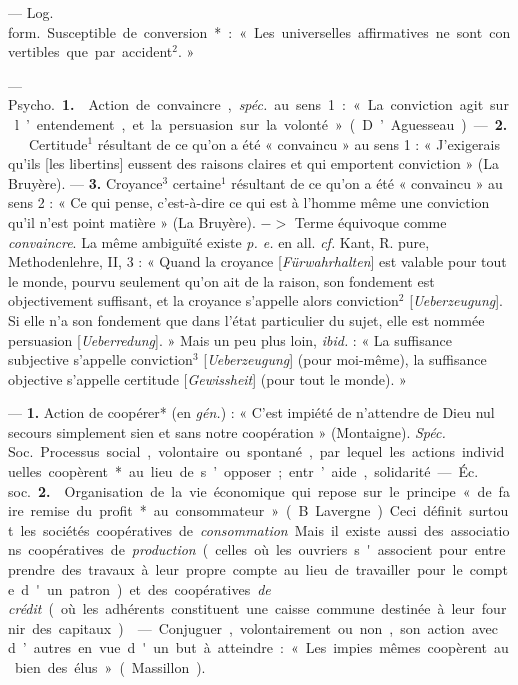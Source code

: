\begin{itemize}[leftmargin=1cm, label=, itemsep=11pt]
 — \si{Log. form.} Susceptible de conversion* : « Les universelles
affirmatives ne sont convertibles que par accident$^2$. »

 — \si{Psycho.} {\bf 1.}  Action de
convaincre,  {\it spéc.} au sens 1 : « La
conviction agit sur l’entendement,
et la persuasion sur la volonté »
(D’Aguesseau). — {\bf 2.}   Certitude$^1$
résultant de ce qu’on a été « convaincu » au sens 1 : « J’exigerais
qu'ils [les libertins] eussent des raisons claires et qui emportent conviction » (La Bruyère). — {\bf 3.}  
Croyance$^3$ certaine$^1$ résultant de ce
qu’on a été « convaincu » au sens 2 :
« Ce qui pense, c’est-à-dire ce qui
est à l’homme même une conviction
qu’il n’est point matière » (La
Bruyère). $->$ Terme équivoque
comme {\it convaincre}. La même ambiguïté existe {\it p. e.} en all. {\it cf.} Kant,
R. pure, Methodenlehre, II, 3 :
« Quand la croyance [{\it Fürwahrhalten}] est valable pour tout le monde,
pourvu seulement qu’on ait de la
raison, son fondement est objectivement suffisant, et la croyance
s’appelle alors conviction$^2$ [{\it Ueberzeugung}]. Si elle n’a son fondement
que dans l’état particulier du sujet,
elle est nommée persuasion [{\it Ueberredung}]. » Mais un peu plus loin, {\it ibid.} :
« La suffisance subjective s'appelle
conviction$^3$ [{\it Ueberzeugung}] (pour
moi-même), la suffisance objective
s’appelle certitude [{\it Gewissheit}] (pour
tout le monde). »

 — {\bf 1.}  Action de coopérer* (en  {\it gén.}) : « C’est impiété de
n'attendre de Dieu nul secours simplement sien et sans notre coopération » (Montaigne). {\it Spéc.} \si{Soc.} Processus social, volontaire ou spontané, par lequel les actions individuelles coopèrent* au lieu de s’opposer; entr’aide, solidarité.

— \si{Éc. soc.} {\bf 2.}  Organisation de
la vie économique qui repose sur le
principe « de faire remise du profit
*au consommateur » (B. Lavergne).
Ceci définit surtout les sociétés
coopératives de {\it consommation}. Mais
il existe aussi des associations coopératives de {\it production} (celles où les
ouvriers s'associent pour entreprendre des travaux à leur propre
compte au lieu de travailler pour le
compte d'un patron) et des coopératives {\it de crédit} (où les adhérents
constituent une caisse commune
destinée à leur fournir des capitaux).

 — Conjuguer, volontairement ou non, son action avec d’autres en vue d'un but à atteindre :
« Les impies mêmes coopèrent au
bien des élus » (Massillon).


\end{itemize}
